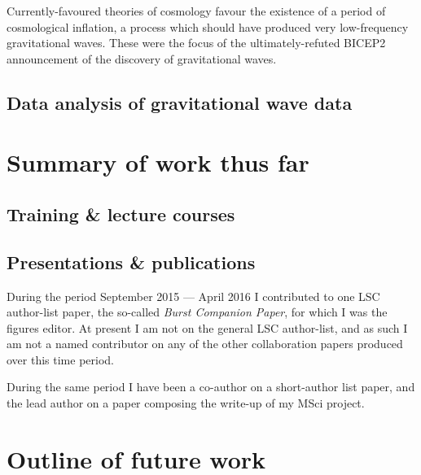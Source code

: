 \documentclass{kentigern}
\begin{document}
Currently-favoured theories of cosmology favour the existence of a
period of cosmological inflation, a process which should have produced
very low-frequency gravitational waves.  These were the focus of the
ultimately-refuted BICEP2 announcement\cite{2014PhRvL.112x1101B} of
the discovery of gravitational waves.

\chapter{Data analysis of gravitational wave data}
\label{cha:data-analys-grav}


\part{Summary of work thus far}
\label{part:work}

\chapter{Training \& lecture courses}
\label{chap:lectures}

\chapter{Presentations \& publications}
\label{chap:pandp}

During the period September 2015 --- April 2016 I contributed to one
LSC author-list paper, the so-called \emph{Burst Companion Paper}, for
which I was the figures editor. At present I am not on the general LSC
author-list, and as such I am not a named contributor on any of the
other collaboration papers produced over this time period.

During the same period I have been a co-author on a short-author list
paper, and the lead author on a paper composing the write-up of my
MSci project.

\part{Outline of future work}
\label{part:future}






\glsaddall
{}
\printglossaries
\end{document}
